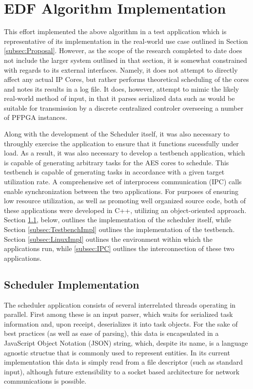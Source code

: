 
\section{EDF Algorithm Implementation}\label{sec:Impl}

This effort implemented the above algorithm in a test application which is representative of its implementation in the real-world use case outlined in Section \ref{subsec:Proposal}. However, as the scope of the research completed to date does not include the larger system outlined in that section, it is somewhat constrained with regards to its external interfaces. Namely, it does not attempt to directly affect any actual IP Cores, but rather performs theoretical scheduling of the cores and notes its results in a log file. It does, however, attempt to mimic the likely real-world method of input, in that it parses serialized data such as would be suitable for transmission by a discrete centralized controler overseeing a number of PFPGA instances.

Along with the development of the Scheduler itself, it was also necessary to throughly exercise the application to ensure that it functions sucessfully under load. As a result, it was also necessary to develop a testbench application, which is capable of generating arbitrary tasks for the AES cores to schedule. This testbench is capable of generating tasks in accordance with a given target utilization rate. A comprehensive set of interprocess communication (IPC) calls enable synchronization between the two applications. For purposes of ensuring low resource utilization, as well as promoting well organized source code, both of these applications were developed in C++, utilizing an object-oriented approach. Section \ref{subsec:SchedulerImpl}, below, outlines the implementation of the scheduler itself, while Section \ref{subsec:TestbenchImpl} outlines the implementation of the testbench. Section \ref{subsec:LinuxImpl} outlines the environment within which the applications run, while \ref{subsec:IPC} outlines the interconnection of these two applications.

\subsection{Scheduler Implementation}\label{subsec:SchedulerImpl}
The scheduler application consists of several interrelated threads operating in parallel. First among these is an input parser, which waits for serialized task information and, upon receipt, deserializes it into task objects. For the sake of best practices (as well as ease of parsing), this data is encapsulated in a JavaScript Object Notation (JSON) string, which, despite its name, is a language agnostic structue that is commonly used to represent entities. In its current implementation this data is simply read from a file descriptor (such as standard input), although future extensibility to a socket based architecture for network communications is possible.

